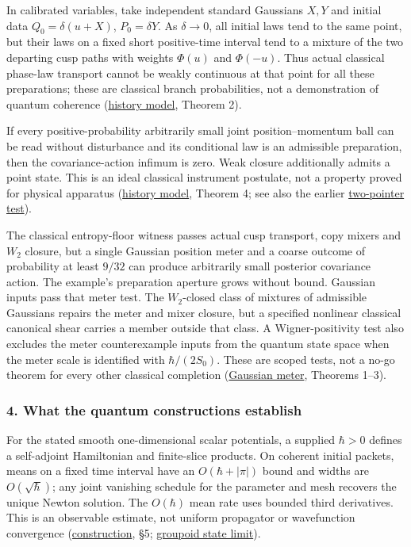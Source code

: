 \documentclass[11pt,a4paper]{article}
\begin{document}
In calibrated variables, take independent standard Gaussians \(X,Y\) and
initial data \(Q_0=\delta(u+X)\), \(P_0=\delta Y\). As \(\delta\to0\),
all initial laws tend to the same point, but their laws on a fixed short
positive-time interval tend to a mixture of the two departing cusp paths
with weights \(\Phi(u)\) and \(\Phi(-u)\). Thus actual classical
phase-law transport cannot be weakly continuous at that point for all
these preparations; these are classical branch probabilities, not a
demonstration of quantum coherence
(\href{cusp-history-records-continuity.md}{history model}, Theorem 2).

If every positive-probability arbitrarily small joint position--momentum
ball can be read without disturbance and its conditional law is an
admissible preparation, then the covariance-action infimum is zero. Weak
closure additionally admits a point state. This is an ideal classical
instrument postulate, not a property proved for physical apparatus
(\href{cusp-history-records-continuity.md}{history model}, Theorem 4;
see also the earlier
\href{necessity-unit-and-indeterminacy.md}{two-pointer test}).

The classical entropy-floor witness passes actual cusp transport, copy
mixers and \(W_2\) closure, but a single Gaussian position meter and a
coarse outcome of probability at least \(9/32\) can produce arbitrarily
small posterior covariance action. The example's preparation aperture
grows without bound. Gaussian inputs pass that meter test. The
\(W_2\)-closed class of mixtures of admissible Gaussians repairs the
meter and mixer closure, but a specified nonlinear classical canonical
shear carries a member outside that class. A Wigner-positivity test also
excludes the meter counterexample inputs from the quantum state space
when the meter scale is identified with \(\hbar/(2S_0)\). These are
scoped tests, not a no-go theorem for every other classical completion
(\href{gaussian-meter-entropy-floor.md}{Gaussian meter}, Theorems 1--3).

\hypertarget{what-the-quantum-constructions-establish}{%
\subsubsection{4. What the quantum constructions
establish}\label{what-the-quantum-constructions-establish}}

For the stated smooth one-dimensional scalar potentials, a supplied
\(\hbar>0\) defines a self-adjoint Hamiltonian and finite-slice
products. On coherent initial packets, means on a fixed time interval
have an \(O(\hbar+|\pi|)\) bound and widths are \(O(\sqrt\hbar)\); any
joint vanishing schedule for the parameter and mesh recovers the unique
Newton solution. The \(O(\hbar)\) mean rate uses bounded third
derivatives. This is an observable estimate, not uniform propagator or
wavefunction convergence
(\href{quantum-blocks-construct-newton.md}{construction}, §5;
\href{groupoid-quantum-newton-states.md}{groupoid state limit}).
\end{document}
